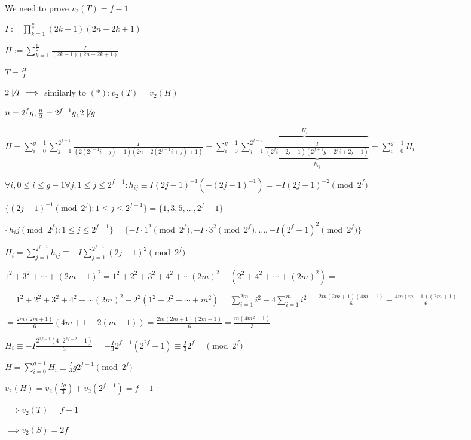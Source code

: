 \documentclass{article}
\begin{document}
We need to prove $v_2(T) = f - 1$

$I := \prod_{k=1}^{\frac{n}{2}} (2k-1)(2n-2k+1)$

$H := \sum_{k=1}^{\frac{n}{2}}\frac{I}{(2k-1)(2n-2k+1)}$

$T = \frac{H}{I}$

$2 \not\mid I \implies$ similarly to $(*): v_2(T) = v_2(H)$

$n=2^fg, \frac{n}{2} = 2^{f-1}g, 2 \not\mid g$

$H = \sum_{i=0}^{g-1}\sum_{j=1}^{2^{f-1}} \frac{I}{(2(2^{f-1} i + j) - 1)(2n-2(2^{f-1} i + j) + 1)} = \sum_{i=0}^{g-1}\overbrace{\sum_{j=1}^{2^{f-1}} \underbrace{\frac{I}{(2^{f} i + 2j - 1)(2^{f+1}g-2^{f} i + 2j + 1)}}_{h_{ij}}}^{H_i} = \sum_{i=0}^{g-1} H_i$

$\forall i, 0 \leq i \leq g - 1 \forall j, 1 \leq j \leq 2^{f-1}: h_{ij} \equiv I (2j-1)^{-1} (-(2j-1)^{-1}) = -I (2j-1)^{-2} \pmod {2^f}$

$\{ (2j-1)^{-1} \pmod {2^f}: 1 \leq j \leq 2^{f-1} \} = \{ 1, 3, 5, \ldots, 2^f - 1 \}$

$\{ h_ij \pmod{2^f}: 1 \leq j \leq 2^{f-1} \} = \{ -I\cdot 1^2 \pmod{2^f}, -I\cdot 3^2 \pmod{2^f}, \ldots, -I (2^f-1)^2 \pmod{2^f} \}$

$H_i = \sum_{j=1}^{2^{f-1}} h_{ij} \equiv -I \sum_{j=1}^{2^{f-1}} (2j-1)^2 \pmod{2^f}$

$1^2 + 3^2 + \cdots + (2m-1)^2 = 1^2 + 2^2 + 3^2 + 4^2 + \cdots (2m)^2 - (2^2 + 4^2 + \cdots + (2m)^2) =$

$= 1^2 + 2^2 + 3^2 + 4^2 + \cdots (2m)^2 - 2^2 (1^2 + 2^2 + \cdots + m^2) = \sum_{i=1}^{2m} i^2 - 4 \sum_{i=1}^m i^2 = \frac{2m(2m+1)(4m+1)}{6} - \frac{4m(m+1)(2m+1)}{6} =$

$= \frac{2m(2m+1)}{6}(4m+1 - 2(m+1)) = \frac{2m(2m+1)(2m-1)}{6} = \frac{m(4m^2-1)}{3}$

$H_i \equiv -I \frac{2^{2f-1}(4 \cdot 2^{2f-2}-1)}{3} = -\frac{I}{3} 2^{f-1}(2^{2f} - 1) \equiv \frac{I}{3} 2^{f-1} \pmod{2^f}$

$H = \sum_{i=0}^{g-1} H_i \equiv \frac{I}{3}g 2^{f-1} \pmod{2^f}$

$v_2(H) = v_2(\frac{Ig}{3}) + v_2(2^{f-1}) = f - 1$

$\implies v_2(T) = f-1$

$\implies v_2(S) = 2f$
\end{document}
